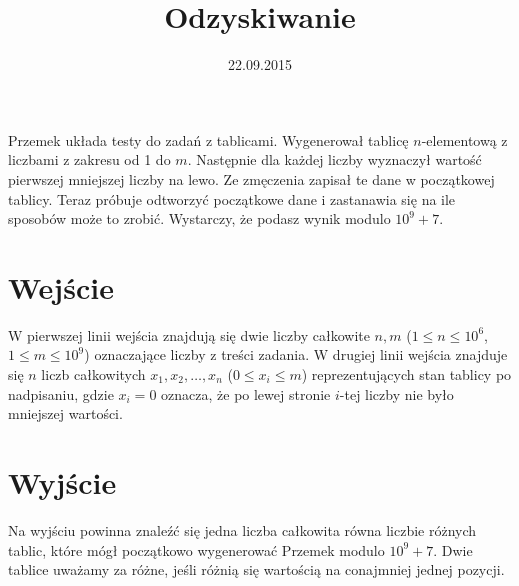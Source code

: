 \documentclass[zad,zawodnik,utf8]{sinol}
\title{Odzyskiwanie}
\author{} %
\date{22.09.2015}
\begin{document}
\begin{tasktext}%
Przemek układa testy do zadań z tablicami. Wygenerował tablicę $n$-elementową z liczbami z zakresu od 1 do $m$. Następnie dla każdej liczby wyznaczył wartość pierwszej mniejszej liczby na lewo. Ze zmęczenia zapisał te dane w początkowej tablicy. Teraz próbuje odtworzyć początkowe dane i zastanawia się na ile sposobów może to zrobić. Wystarczy, że podasz wynik modulo $10^9 + 7$.

  \section{Wejście}
W pierwszej linii wejścia znajdują się dwie liczby całkowite $n, m$ ($1 \leq n \leq 10^6$, $1 \leq m \leq 10^9$) oznaczające liczby z treści zadania.
W drugiej linii wejścia znajduje się $n$ liczb całkowitych $x_1, x_2, \ldots, x_n$ ($0 \leq x_i \leq m$) reprezentujących stan tablicy po nadpisaniu, gdzie $x_i = 0$ oznacza, że po lewej stronie $i$-tej liczby nie było mniejszej wartości.

  \section{Wyjście}
Na wyjściu powinna znaleźć się jedna liczba całkowita równa liczbie różnych tablic, które mógł początkowo wygenerować Przemek modulo $10^9 + 7$.
Dwie tablice uważamy za różne, jeśli różnią się wartością na conajmniej jednej pozycji.

\makecompactexample

\end{tasktext}
\end{document}
